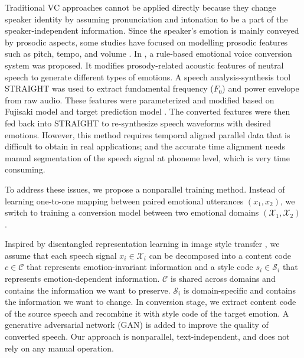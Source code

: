 \documentclass{article}
\begin{document}

Traditional VC approaches cannot be applied directly because they change speaker identity by assuming pronunciation and intonation to be a part of the speaker-independent information. Since the speaker's emotion is mainly conveyed by prosodic aspects, some studies have focused on modelling prosodic features such as pitch, tempo, and volume \cite{wang2012emotional,wang2014multi}. In \cite{xue2018voice}, a rule-based emotional voice conversion system was proposed. It modifies prosody-related acoustic features of neutral speech to generate different types of emotions. A speech analysis-synthesis tool STRAIGHT \cite{kawahara1999restructuring} was used to extract fundamental frequency ($F_0$) and power envelope from raw audio. These features were parameterized and modified based on Fujisaki model \cite{fujisaki1984analysis} and target prediction model \cite{xue2016study}. The converted features were then fed back into STRAIGHT to re-synthesize speech waveforms with desired emotions. However, this method requires temporal aligned parallel data that is difficult to obtain in real applications; and the accurate time alignment needs manual segmentation of the speech signal at phoneme level, which is very time consuming.

To address these issues, we propose a nonparallel training method. Instead of learning one-to-one mapping between paired emotional utterances $(x_1, x_2)$, we switch to training a conversion model between two emotional domains $(\mathcal{X}_1, \mathcal{X}_2)$.

Inspired by disentangled representation learning in image style transfer \cite{gatys2016image}, we assume that each speech signal $x_i \in \mathcal{X}_i$ can be decomposed into a content code $c \in \mathcal{C}$ that represents emotion-invariant information and a style code $s_i \in \mathcal{S}_i$ that represents emotion-dependent information. $\mathcal{C}$ is shared across domains and contains the information we want to preserve. $\mathcal{S}_i$ is domain-specific and contains the information we want to change. In conversion stage, we extract content code of the source speech and recombine it with style code of the target emotion. A generative adversarial network (GAN) \cite{goodfellow2014generative} is added to improve the quality of converted speech. Our approach is nonparallel, text-independent, and does not rely on any manual operation.
\end{document}
